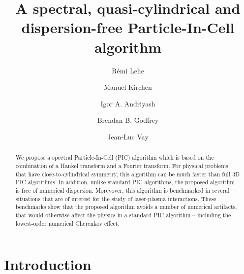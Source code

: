 \documentclass[1p,times,authoryear]{elsarticle}
\title{A spectral, quasi-cylindrical and dispersion-free Particle-In-Cell algorithm}
\author[label1]{R\'emi {Lehe}}
\author[label2]{Manuel {Kirchen}}
\author[label3]{Igor A. {Andriyash}}
\author[label4]{Brendan B. {Godfrey}}
\author[label1]{Jean-Luc {Vay}}
\begin{document}
\begin{abstract}
We propose a spectral Particle-In-Cell (PIC) algorithm which is based 
on the combination of a Hankel transform and a Fourier transform. 
For physical problems that have close-to-cylindrical symmetry, this
algorithm can be much faster than full 3D PIC algorithms. In addition,
unlike standard PIC algorithms, the proposed algorithm is free of numerical
dispersion. Morevover, this algorithm is benchmarked in several situations that
are of interest for the study of laser-plasma interactions. These
benchmarks show that the proposed algorithm 
avoids a number of numerical artifacts, that
would otherwise affect the physics in a standard PIC algorithm -- 
including the lowest-order numerical Cherenkov effect.
\end{abstract}

\maketitle

\section*{Introduction}
\end{document}
